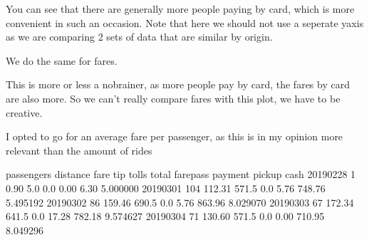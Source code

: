 \documentclass[letterpaper,10pt,english]{jupyterBook}
\begin{document}
\noindent{}

\sphinxAtStartPar
You can see that there are generally more people paying by card, which is more convenient in such an occasion.
Note that here we should not use a seperate y\sphinxhyphen{}axis as we are comparing 2 sets of data that are similar by origin.

\sphinxAtStartPar
We do the same for fares.

\begin{sphinxVerbatim}[commandchars=\\\{\}]
  \PYG{p}{[}\PYG{p}{]}
\end{sphinxVerbatim}

\noindent{}

\sphinxAtStartPar
This is more or less a no\sphinxhyphen{}brainer, as more people pay by card, the fares by card are also more.
So we can’t really compare fares with this plot, we have to be creative.

\sphinxAtStartPar
I opted to go for an average fare per passenger, as this is in my opinion more relevant than the amount of rides

\begin{sphinxVerbatim}[commandchars=\\\{\}]
\PYG{p}{[}\PYG{p}{]}  
\end{sphinxVerbatim}

\begin{sphinxVerbatim}[commandchars=\\\{\}]
                    passengers  distance   fare  tip  tolls   total  fare\PYGZus{}pass
payment pickup                                                                
cash    2019\PYGZhy{}02\PYGZhy{}28           1      0.90    5.0  0.0   0.00    6.30   5.000000
        2019\PYGZhy{}03\PYGZhy{}01         104    112.31  571.5  0.0   5.76  748.76   5.495192
        2019\PYGZhy{}03\PYGZhy{}02          86    159.46  690.5  0.0   5.76  863.96   8.029070
        2019\PYGZhy{}03\PYGZhy{}03          67    172.34  641.5  0.0  17.28  782.18   9.574627
        2019\PYGZhy{}03\PYGZhy{}04          71    130.60  571.5  0.0   0.00  710.95   8.049296
\end{sphinxVerbatim}
\end{document}
